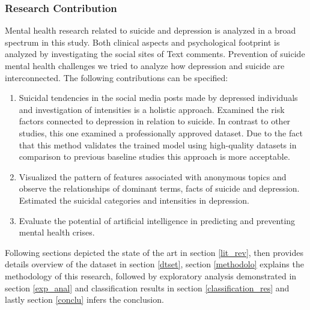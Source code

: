 \documentclass[sn-mathphys,Numbered]{sn-jnl}%
\theoremstyle{thmstyleone}%
\theoremstyle{thmstyletwo}%
\theoremstyle{thmstylethree}%
\begin{document}
\subsubsection{Research Contribution}
Mental health research related to suicide and depression is analyzed in a broad spectrum in this study. Both clinical aspects and psychological footprint is analyzed by investigating the social sites of Text comments. Prevention of suicide mental health challenges we tried to analyze how depression and suicide are interconnected. The following contributions can be specified:
%
\begin{enumerate}
\item Suicidal tendencies in the social media posts made by depressed individuals and investigation of intensities is a holistic approach. Examined the risk factors connected to depression in relation to suicide. In contrast to other studies, this one examined a professionally approved dataset. Due to the fact that this method validates the trained model using high-quality datasets in comparison to previous baseline studies this approach is more acceptable. 
\item  Visualized the pattern of features associated with anonymous topics and observe the relationships of dominant terms, facts of suicide and depression. Estimated the suicidal categories and intensities in depression. 
\item Evaluate the potential of artificial intelligence in predicting and preventing mental health crises.
\end{enumerate}
Following sections depicted the state of the art in section \ref{lit_rev}, then provides details overview of the dataset in section \ref{dtset}, section \ref{methodolo} explains the methodology of this research, followed by exploratory analysis demonstrated in section \ref{exp_anal} and classification results in section \ref{classification_res} and lastly section \ref{conclu} infers the conclusion. 
\end{document}
